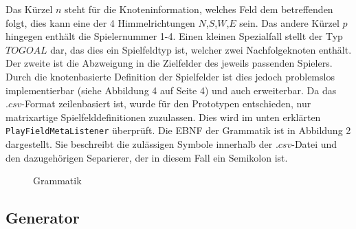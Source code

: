\documentclass[conference]{IEEEtran}
\begin{document}
Das K\"urzel $n$ steht f\"ur die Knoteninformation, welches Feld dem betreffenden folgt, dies kann eine der 4 Himmelrichtungen $N$,$S$,$W$,$E$ sein. Das andere K\"urzel $p$ hingegen enth\"alt die Spielernummer 1-4. Einen kleinen Spezialfall stellt der Typ $TOGOAL$ dar, das dies ein Spielfeldtyp ist, welcher zwei Nachfolgeknoten enth\"alt. Der zweite ist die Abzweigung in die Zielfelder des jeweils passenden Spielers. Durch die knotenbasierte Definition
der Spielfelder ist dies jedoch problemslos implementierbar (siehe Abbildung 4 auf Seite 4) und auch erweiterbar.
Da das $.csv$-Format zeilenbasiert ist, wurde f\"ur den Prototypen entschieden, nur matrixartige Spielfelddefinitionen zuzulassen. Dies wird im unten erkl\"arten \texttt{PlayFieldMetaListener} \"uberpr\"uft.
Die EBNF der Grammatik ist in Abbildung 2 dargestellt. Sie beschreibt die zul\"assigen Symbole innerhalb der $.csv$-Datei und den dazugeh\"origen Separierer, der in diesem Fall ein Semikolon ist. 

\begin{figure}[]
    \centering
    \caption{Grammatik}
\end{figure}


\subsection{Generator}
\end{document}
